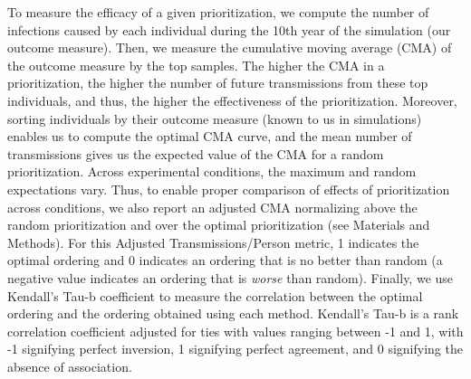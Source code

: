 \documentclass[oupdraft]{sysbio}
\newcommand{\PLWH}{sample\xspace}
\begin{document}
To measure the efficacy of a given prioritization,
we compute the number of infections caused by each individual during the 10th year of the simulation (our outcome measure).
Then, we measure the cumulative moving average (CMA) of the outcome measure by the top \PLWH{s}. 
The higher the CMA in a prioritization, the higher the number of future transmissions from these {top} individuals, and thus, the higher the effectiveness of the prioritization. 
Moreover, sorting individuals by their outcome measure (known to us in simulations) enables us to compute the optimal CMA curve, and the mean number of transmissions gives us the expected value of the CMA for a random prioritization.
Across experimental conditions, the maximum and random expectations vary.
Thus, to enable proper comparison of {effects of prioritization} across conditions,
we also report an adjusted CMA normalizing above the random prioritization and over the optimal prioritization (see Materials and Methods).
For this Adjusted Transmissions/Person metric, 1 indicates the optimal ordering and 0 indicates an ordering that is no better than random (a negative value indicates an ordering that is \textit{worse} than random). 
Finally, we use Kendall's Tau-b coefficient to measure the correlation between the optimal ordering and the ordering obtained using each method. 
Kendall's Tau-b is a rank correlation coefficient adjusted for ties \citep{Kendall1938} with values ranging between -1 and 1, with -1 signifying perfect inversion, 1 signifying perfect agreement, and 0 signifying the absence of association.
\end{document}
